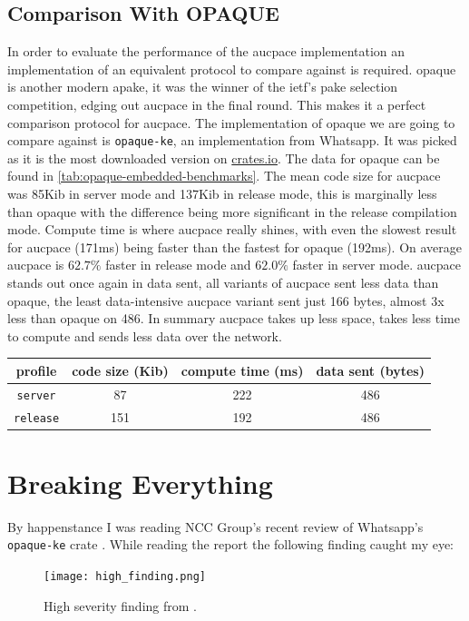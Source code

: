 \subsection{Comparison With OPAQUE}
In order to evaluate the performance of the \gls{aucpace} implementation an implementation of an equivalent protocol to compare against is required.
\gls{opaque} is another modern \gls{apake}, it was the winner of the \gls{ietf}'s \gls{pake} selection competition, edging out \gls{aucpace} in the final round.
This makes it a perfect comparison protocol for \gls{aucpace}.
The implementation of \gls{opaque} we are going to compare against is \texttt{opaque-ke}, an implementation from Whatsapp.
It was picked as it is the most downloaded version on \href{https://crates.io/}{crates.io}.
The data for \gls{opaque} can be found in \cref{tab:opaque-embedded-benchmarks}.
The mean code size for \gls{aucpace} was 85Kib in server mode and 137Kib in release mode, this is marginally less than \gls{opaque} with the difference being more significant in the release compilation mode.
Compute time is where \gls{aucpace} really shines, with even the slowest result for \gls{aucpace} (171ms) being faster than the fastest for \gls{opaque} (192ms).
On average \gls{aucpace} is $62.7\%$ faster in release mode and $62.0\%$ faster in server mode.
\gls{aucpace} stands out once again in data sent, all variants of \gls{aucpace} sent less data than \gls{opaque}, the least data-intensive \gls{aucpace} variant sent just 166 bytes, almost 3x less than \gls{opaque} on 486.
In summary \gls{aucpace} takes up less space, takes less time to compute and sends less data over the network.

\clearpage

\begin{center}
  \label{tab:opaque-embedded-benchmarks}
  \begin{tabular}{ cccc }
    \toprule
    profile & code size (Kib) & compute time (ms) & data sent (bytes) \\
    \midrule
    \texttt{server}  & 87 & 222 & 486 \\
    \texttt{release} & 151 & 192 & 486 \\
    \bottomrule
  \end{tabular}
\end{center}

\section{Breaking Everything}
By happenstance I was reading NCC Group's recent review of Whatsapp's \texttt{opaque-ke} crate \cite{whatsapp-are-dumb-too, whatsapp-are-dumb-too-report}.
While reading the report the following finding caught my eye:
\begin{figure}[H]
  \centering

  \texttt{[image: high\_finding.png]}
  \caption{High severity finding from \cite{whatsapp-are-dumb-too-report}.}
  \label{fig:high-severity-finding}
\end{figure}

